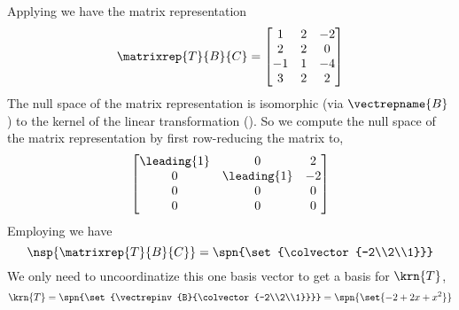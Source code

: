 %
Applying  we have the matrix representation
%
\begin{equation*}
\matrixrep{T}{B}{C}=
\begin{bmatrix}
 1 & 2 & -2 \\
 2 & 2 & 0 \\
 -1 & 1 & -4 \\
 3 & 2 & 2
\end{bmatrix}
\end{equation*}
%
The null space of the matrix representation is isomorphic (via $\vectrepname{B}$) to the kernel of the linear transformation ().  So we compute the null space of the matrix representation by first row-reducing the matrix to,
%
\begin{equation*}
\begin{bmatrix}
 \leading{1} & 0 & 2 \\
 0 & \leading{1} & -2 \\
 0 & 0 & 0 \\
 0 & 0 & 0
\end{bmatrix}
\end{equation*}
%
Employing  we have 
%
\begin{equation*}
\nsp{\matrixrep{T}{B}{C}}=\spn{\set{\colvector{-2\\2\\1}}}
\end{equation*}
%
We only need to uncoordinatize this one basis vector to get a basis for $\krn{T}$,
%
\begin{equation*}
\krn{T}
=\spn{\set{\vectrepinv{B}{\colvector{-2\\2\\1}}}}
=\spn{\set{-2+2x+x^2}}
\end{equation*}
